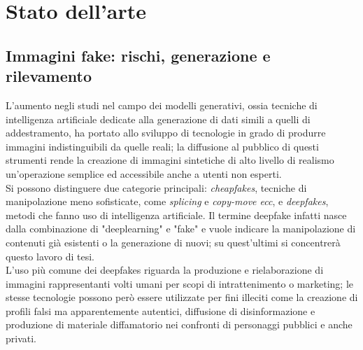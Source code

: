 \chapter{Stato dell'arte}\label{ch:theory}
\section{Immagini fake: rischi, generazione e rilevamento}\label{sec:fakeimg}
L'aumento negli studi nel campo dei modelli generativi, ossia tecniche di intelligenza artificiale dedicate alla generazione di dati simili a quelli di addestramento, ha portato allo sviluppo di tecnologie in grado di produrre immagini indistinguibili da quelle reali; la diffusione al pubblico di questi strumenti rende la creazione di immagini sintetiche di alto livello di realismo un'operazione semplice ed accessibile anche a utenti non esperti.\\ 
Si possono distinguere due categorie principali: \textit{cheapfakes}, tecniche di manipolazione meno sofisticate, come \textit{splicing} e \textit{copy-move ecc}, e  \textit{deepfakes}, metodi che fanno uso di intelligenza artificiale. 
Il termine deepfake infatti nasce dalla combinazione di "deeplearning" e "fake" e vuole indicare la manipolazione di contenuti già esistenti o la generazione di nuovi; su quest'ultimi si concentrerà questo lavoro di tesi.\\
L'uso più comune dei deepfakes riguarda la produzione e rielaborazione di immagini rappresentanti volti umani per scopi di intrattenimento o marketing; le stesse tecnologie possono però essere utilizzate per fini illeciti come la creazione di profili falsi ma apparentemente autentici, diffusione di disinformazione e produzione di materiale diffamatorio nei confronti di personaggi pubblici e anche privati.
